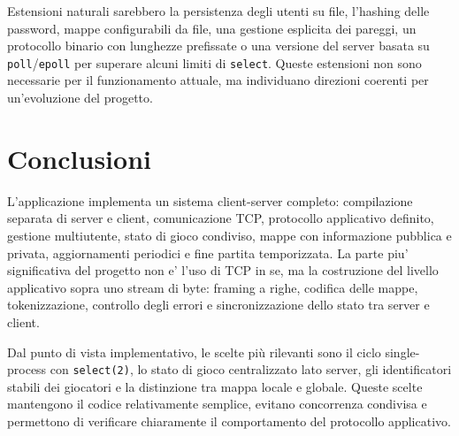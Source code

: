 \documentclass[11pt,a4paper]{article}
\begin{document}
Estensioni naturali sarebbero la persistenza degli utenti su file, l'hashing
delle password, mappe configurabili da file, una gestione esplicita dei pareggi,
un protocollo binario con lunghezze prefissate o una versione del server basata
su \texttt{poll}/\texttt{epoll} per superare alcuni limiti di \texttt{select}.
Queste estensioni non sono necessarie per il funzionamento attuale, ma
individuano direzioni coerenti per un'evoluzione del progetto.

\section{Conclusioni}

L'applicazione implementa un sistema client-server completo: compilazione
separata di server e client, comunicazione TCP, protocollo applicativo definito,
gestione multiutente, stato di gioco condiviso, mappe con informazione pubblica
e privata, aggiornamenti periodici e fine partita temporizzata. La parte piu'
significativa del progetto non e' l'uso di TCP in se, ma la costruzione del
livello applicativo sopra uno stream di byte: framing a righe, codifica delle
mappe, tokenizzazione, controllo degli errori e sincronizzazione dello stato tra
server e client.

Dal punto di vista implementativo, le scelte più rilevanti sono il ciclo
single-process con \texttt{select(2)}, lo stato di gioco centralizzato lato
server, gli identificatori stabili dei giocatori e la distinzione tra mappa
locale e globale. Queste scelte mantengono il codice relativamente semplice,
evitano concorrenza condivisa e permettono di verificare chiaramente il
comportamento del protocollo applicativo.
\end{document}
